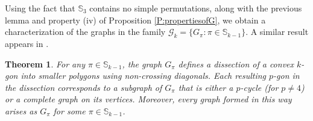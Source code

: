 \documentclass{birkjour}
\newtheorem{thm}{Theorem}[section]
\theoremstyle{definition}
\theoremstyle{remark}
\numberwithin{equation}{section}
\begin{document}
 \noindent Using the fact that $\mathbb{S}_3$ contains
 no simple permutations, along with the previous
 lemma and property (iv) of Proposition \ref{P:propertiesofG},
 we obtain a characterization of the graphs in the family
 $\mathcal{G}_k = \{G_{\pi} : \pi \in \mathbb{S}_{k-1}\}$.
  A similar result appears in \cite[Theorem 3.10]{Bag}.

\begin{thm}For any $\pi \in \mathbb{S}_{k-1}$,
the graph $G_\pi$ defines a dissection of a convex $k$-gon into
smaller polygons using non-crossing
 diagonals. Each resulting $p$-gon in the dissection
 corresponds to a subgraph of $G_\pi$ that is either
 a $p$-cycle (for $p \ne 4$) or a complete graph on
 its vertices. Moreover, every
graph formed in this way arises as $G_\pi$
for some $\pi \in \mathbb{S}_{k-1}$.
\end{thm}
\end{document}
